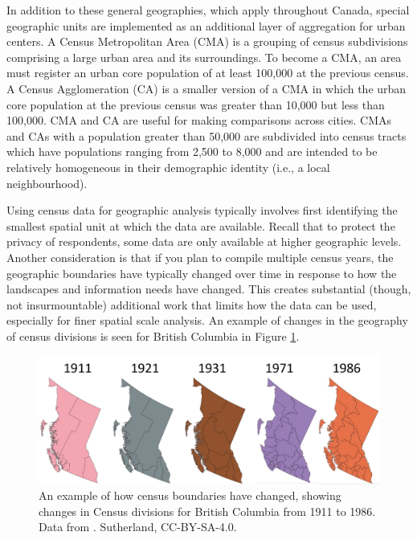 \documentclass[
]{book}
\begin{document}
In addition to these general geographies, which apply throughout Canada, special geographic units are implemented as an additional layer of aggregation for urban centers. A Census Metropolitan Area (CMA) is a grouping of census subdivisions comprising a large urban area and its surroundings. To become a CMA, an area must register an urban core population of at least 100,000 at the previous census. A Census Agglomeration (CA) is a smaller version of a CMA in which the urban core population at the previous census was greater than 10,000 but less than 100,000. CMA and CA are useful for making comparisons across cities. CMAs and CAs with a population greater than 50,000 are subdivided into census tracts which have populations ranging from 2,500 to 8,000 and are intended to be relatively homogeneous in their demographic identity (i.e., a local neighbourhood).

Using census data for geographic analysis typically involves first identifying the smallest spatial unit at which the data are available. Recall that to protect the privacy of respondents, some data are only available at higher geographic levels. Another consideration is that if you plan to compile multiple census years, the geographic boundaries have typically changed over time in response to how the landscapes and information needs have changed. This creates substantial (though, not insurmountable) additional work that limits how the data can be used, especially for finer spatial scale analysis. An example of changes in the geography of census divisions is seen for British Columbia in Figure \ref{fig:4-shifting-census-boundaries}.



\begin{figure}
\includegraphics[width=0.75\linewidth]{images/04-shifting-census-boundaries} \caption{An example of how census boundaries have changed, showing changes in Census divisions for British Columbia from 1911 to 1986. Data from \citep{clark_historical_2016}. Sutherland, CC-BY-SA-4.0.}\label{fig:4-shifting-census-boundaries}
\end{figure}
\end{document}
